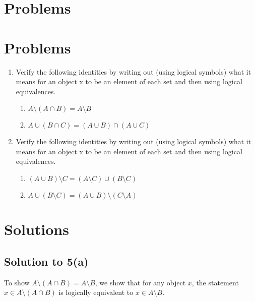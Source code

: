 \documentclass{scrartcl}
\begin{document}
    \section*{Problems}

    \section*{Problems}

    \begin{enumerate}[start=5]
        \item Verify the following identities by writing out (using logical symbols) what it means for an object x to be an element of each set and then using logical equivalences.
        \begin{enumerate}
            \item $A \setminus (A \cap B) = A \setminus B$
            \item $A \cup (B \cap C) = (A \cup B) \cap (A \cup C)$
        \end{enumerate}

        \item Verify the following identities by writing out (using logical symbols) what it means for an object x to be an element of each set and then using logical equivalences.
        \begin{enumerate}
            \item $(A \cup B) \setminus C = (A \setminus C) \cup (B \setminus C)$
            \item $A \cup (B \setminus C) = (A \cup B) \setminus (C \setminus A)$
        \end{enumerate}
    \end{enumerate}

    \section*{Solutions}

    \subsection*{Solution to 5(a)}
    To show $A \setminus (A \cap B) = A \setminus B$, we show that for any object $x$, the statement $x \in A \setminus (A \cap B)$ is logically equivalent to $x \in A \setminus B$.
\end{document}
